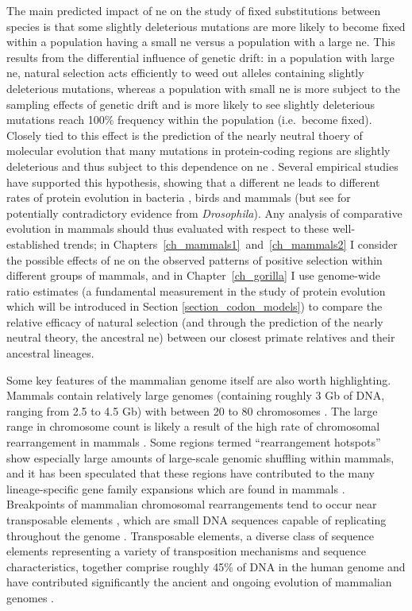The main predicted impact of \ac{ne} on the study of fixed
substitutions between species is that some slightly deleterious
mutations are more likely to become fixed within a population having a
small \ac{ne} versus a population with a large \ac{ne}. This results
from the differential influence of genetic drift: in a population with
large \ac{ne}, natural selection acts efficiently to weed out alleles
containing slightly deleterious mutations, whereas a population with
small \ac{ne} is more subject to the sampling effects of genetic drift
and is more likely to see slightly deleterious mutations reach 100\%
frequency within the population (i.e.\ become fixed). Closely tied to
this effect is the prediction of the nearly neutral thoery of
molecular evolution \citep{Kimura1985} that many mutations in
protein-coding regions are slightly deleterious and thus subject to
this dependence on \ac{ne}
\citep{Kimura1974,Kimura1985,Ohta1992}. Several empirical studies have
supported this hypothesis, showing that a different \ac{ne} leads to
different rates of protein evolution in bacteria
\citep{Moran2008,Warnecke2011}, birds \citep{Axelsson2009} and mammals
\citep{Kosiol2008,Ellegren2009} (but see \citet{Bachtrog2008} for
potentially contradictory evidence from \emph{Drosophila}). Any
analysis of comparative evolution in mammals should thus evaluated
with respect to these well-established trends; in Chapters~\ref{ch_mammals1}~and~\ref{ch_mammals2} I consider the possible
effects of \ac{ne} on the observed patterns of positive selection
within different groups of mammals, and in Chapter~\ref{ch_gorilla} I
use genome-wide \dnds ratio estimates (a fundamental measurement in
the study of protein evolution which will be introduced in Section
\ref{section_codon_models}) to compare the relative efficacy of
natural selection (and through the prediction of the nearly neutral
theory, the ancestral \ac{ne}) between our closest primate relatives
and their ancestral lineages.

Some key features of the mammalian genome itself are also worth
highlighting. Mammals contain relatively large genomes (containing
roughly 3 Gb of DNA, ranging from 2.5 to 4.5 Gb) with between 20 to 80
chromosomes \citep{Bachmann1972}. The large range in chromosome count
is likely a result of the high rate of chromosomal rearrangement in
mammals \citep{Eichler2003,Pevzner2003}. Some regions termed
``rearrangement hotspots'' show especially large amounts of
large-scale genomic shuffling within mammals, and it has been
speculated that these regions have contributed to the many
lineage-specific gene family expansions which are found in mammals
\citep{Eichler2003}. Breakpoints of mammalian chromosomal
rearrangements tend to occur near transposable elements
\citep{Zhao2009}, which are small DNA sequences capable of replicating
throughout the genome \citep{Lander2001}. Transposable elements, a
diverse class of sequence elements representing a variety of
transposition mechanisms and sequence characteristics, together
comprise roughly 45\% of DNA in the human genome and have contributed
significantly the ancient and ongoing evolution of mammalian genomes
\citep{Lander2001,Cordaux2009}.

